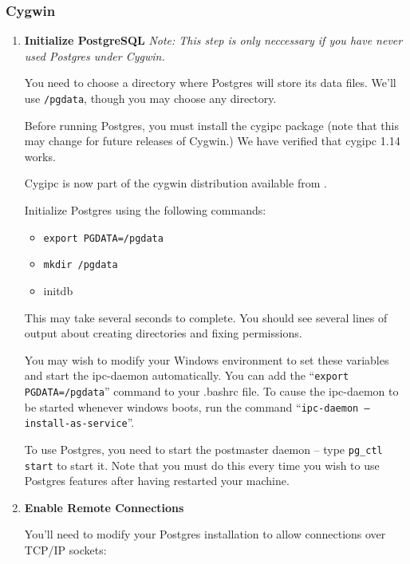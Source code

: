 \documentclass[11pt]{article}
\begin{document}
\subsubsection{Cygwin}\label{sec:cygwin}

\begin{enumerate}
\item{\bf Initialize PostgreSQL} 
{\it Note:  This step is only neccessary if you have never used Postgres under Cygwin.}

You need to choose a directory where Postgres will store its data files.  We'll
use {\tt /pgdata}, though you may choose any directory.

Before running Postgres, you must install the cygipc   package (note that this may change
for future releases of Cygwin.)  We have verified that cygipc 1.14 works.

Cygipc is now part of the cygwin distribution available from . 

Initialize Postgres using the following commands:

\begin{itemize}
\item {\tt export PGDATA=/pgdata}
\item {\tt mkdir /pgdata}
\item {initdb}
\end{itemize}

This may take several seconds to complete.  You should see several lines of output
about creating directories and fixing permissions.

You may wish to modify your Windows environment to set these variables and start the
ipc-daemon automatically.  You can add the ``{\tt export PGDATA=/pgdata}'' command to
your .bashrc file.  To cause the ipc-daemon to be started whenever windows boots,
run the command ``{\tt ipc-daemon --install-as-service}''.

To use Postgres, you need to start the postmaster daemon -- type {\tt pg\_ctl start}
to start it. Note that you must do this every time you wish to use Postgres
features after having restarted your machine.

\item{\bf Enable Remote Connections}

You'll need to modify your Postgres installation to allow connections
over TCP/IP sockets:

\begin{itemize}


\end{itemize}
\end{enumerate}
\end{document}
